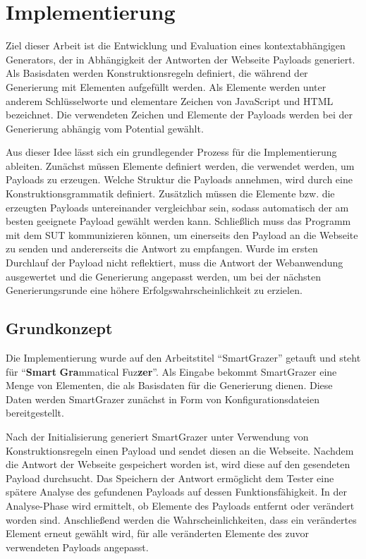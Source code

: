 \chapter{Implementierung}

Ziel dieser Arbeit ist die Entwicklung und Evaluation eines kontextabhängigen Generators, der in Abhängigkeit der Antworten der Webseite Payloads generiert. Als Basisdaten werden Konstruktionsregeln definiert, die während der Generierung mit Elementen aufgefüllt werden. Als Elemente werden unter anderem Schlüsselworte und elementare Zeichen von JavaScript und HTML bezeichnet. Die verwendeten Zeichen und Elemente der Payloads werden bei der Generierung abhängig vom Potential gewählt.

Aus dieser Idee lässt sich ein grundlegender Prozess für die Implementierung ableiten. Zunächst müssen Elemente definiert werden, die verwendet werden, um Payloads zu erzeugen. Welche Struktur die Payloads annehmen, wird durch eine Konstruktionsgrammatik definiert. Zusätzlich müssen die Elemente bzw. die erzeugten Payloads untereinander vergleichbar sein, sodass automatisch der am besten geeignete Payload gewählt werden kann. Schließlich muss das Programm mit dem \ac{SUT} kommunizieren können, um einerseits den Payload an die Webseite zu senden und andererseits die Antwort zu empfangen. Wurde im ersten Durchlauf der Payload nicht reflektiert, muss die Antwort der Webanwendung ausgewertet und die Generierung angepasst werden, um bei der nächsten Generierungsrunde eine höhere Erfolgswahrscheinlichkeit zu erzielen.

\section{Grundkonzept}

Die Implementierung wurde auf den Arbeitstitel ``SmartGrazer'' getauft und steht für ``\textbf{Smart} \textbf{Gra}mmatical Fuz\textbf{zer}''. Als Eingabe bekommt SmartGrazer eine Menge von Elementen, die als Basisdaten für die Generierung dienen. Diese Daten werden SmartGrazer zunächst in Form von Konfigurationsdateien bereitgestellt. 

Nach der Initialisierung generiert SmartGrazer unter Verwendung von Konstruktionsregeln einen Payload und sendet diesen an die Webseite. Nachdem die Antwort der Webseite gespeichert worden ist, wird diese auf den gesendeten Payload durchsucht. Das Speichern der Antwort ermöglicht dem Tester eine spätere Analyse des gefundenen Payloads auf dessen Funktionsfähigkeit. In der Analyse-Phase wird ermittelt, ob Elemente des Payloads entfernt oder verändert worden sind. Anschließend werden die Wahrscheinlichkeiten, dass ein verändertes Element erneut gewählt wird, für alle veränderten Elemente des zuvor verwendeten Payloads angepasst.

